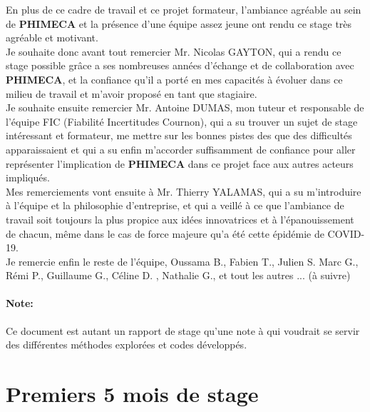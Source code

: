 \documentclass[a4paper,10pt]{article}
\begin{document}
En plus de ce cadre de travail et ce projet formateur, l'ambiance agréable au sein de \textbf{PHIMECA} et la présence d'une équipe assez jeune ont rendu ce stage très agréable et motivant. \\

Je souhaite donc avant tout remercier Mr. Nicolas GAYTON, qui a rendu ce stage possible grâce a ses nombreuses années d'échange et de collaboration avec \textbf{PHIMECA}, et la confiance qu'il a porté en mes capacités à évoluer dans ce milieu de travail et m'avoir proposé en tant que stagiaire.\\

Je souhaite ensuite remercier Mr. Antoine DUMAS, mon tuteur et responsable de l'équipe FIC (Fiabilité Incertitudes Cournon), qui a su trouver un sujet de stage intéressant et formateur, me mettre sur les bonnes pistes
des que des difficultés apparaissaient et qui a su enfin m'accorder suffisamment de confiance pour aller représenter l'implication de \textbf{PHIMECA} dans ce projet face aux autres acteurs impliqués. \\

Mes remerciements vont ensuite à Mr. Thierry YALAMAS, qui a su m'introduire à l'équipe et la philosophie d'entreprise, et qui a veillé à ce que l'ambiance de travail soit toujours la plus propice aux idées innovatrices et à l'épanouissement de chacun, même dans le cas de force majeure qu'a été cette épidémie de COVID-19. \\

Je remercie enfin le reste de l'équipe, Oussama B., Fabien T., Julien S. Marc G., Rémi P., Guillaume G., Céline D. , Nathalie G., et tout les autres ... (à suivre)

\paragraph{Note:}
Ce document est autant un rapport de stage qu'une note à qui voudrait se servir des différentes méthodes explorées et codes développés.

\newpage
\section{Premiers 5 mois de stage}
\end{document}
